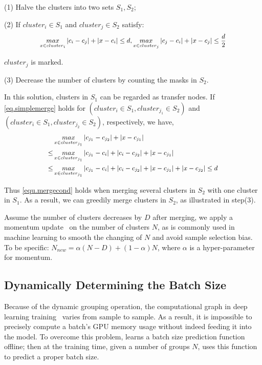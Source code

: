 (1) Halve the clusters into two sets $S_1,S_2$;

(2) If $cluster_i \in S_1$ and $cluster_j \in S_2$ satisfy:
\vspace{-2mm}
\begin{equation}
\small
\label{eq.simplemerge}
\begin{aligned}
\mathop{max}\limits_{x \in cluster_{i}} |c_{i}-c_{j}|+|x-c_{i}| \leq d,  \mathop{max}\limits_{x \in cluster_{j}} |c_{j}-c_{i}|+|x-c_{j}| \leq \frac{d}{2}
\end{aligned}
\end{equation}

$cluster_j$ is marked.

(3) Decrease the number of clusters by counting the masks in $S_2$.

\smallskip
\noindent
In this solution, clusters in $S_1$ can be regarded as transfer nodes.
If \eqref{eq.simplemerge} holds for $(cluster_i \in S_1,cluster_{j_1}\in S_2)$ and $(cluster_i \in S_1,cluster_{j_2}\in S_2)$, respectively, we have,
\vspace{-1mm}
\begin{equation}
\small
\begin{aligned}
&\mathop{max}\limits_{x \in cluster_{j_1}} |c_{j_1}-c_{j_2}|+|x-c_{j_1}| \\
\leq &\mathop{max}\limits_{x \in cluster_{j_1}} |c_{j_1}-c_{i}|+|c_{i}-c_{j_2}|+|x-c_{j_1}|\\
\leq &\mathop{max}\limits_{x \in cluster_{j_1}} |c_{j_1}-c_{i}|+|c_{i}-c_{j_2}|+|x-c_{j_1}|+|x-c_{j_2}| \leq d
\end{aligned}
\end{equation}

Thus \eqref{equ.mergecond} holds when merging several clusters in $S_2$ with one cluster in $S_1$. As a result, we can greedily merge clusters in $S_2$, as illustrated in step(3). 

Assume the number of clusters decreases by $D$ after merging, we apply a momentum update~\cite{qian1999momentum} on the number of clusters $N$, as is commonly used in machine learning to smooth the changing of $N$ and avoid sample selection bias. To be specific:
$N_{new}=\alpha (N-D)+(1-\alpha)N$, where $\alpha$ is a hyper-parameter for momentum.

\subsection{Dynamically Determining the Batch Size}
\label{sec.scheduler.batch}
Because of the dynamic grouping operation, the computational graph in deep learning training~\cite{abadi2016tensorflow} varies from sample to sample. As a result, it is impossible to precisely compute a batch's GPU memory usage without indeed feeding it into the model. To overcome this problem, \system learns a batch size prediction function offline; then at the \system training time, given a number of groups $N$, \system uses this function to predict a proper batch size.


